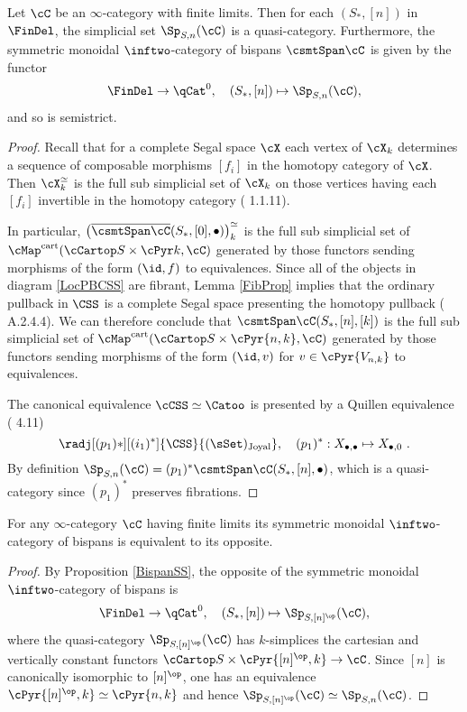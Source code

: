 \documentclass[a4paper]{article}
\numberwithin{equation}{section}
\begin{document}
\begin{prop}
\label{BispanSS}
Let $\cC$ be an $\infty$-category with finite limits. Then for each $(S_*,[n])$ in $\FinDel$, the simplicial set $\Sp_{S,n}(\cC)$ is a quasi-category. Furthermore, the symmetric monoidal $\inftwo$-category of bispans $\csmtSpan \cC$ is given by the functor
  \begin{equation*}
   \FinDel \to \qCat^0, \quad (S_*, [n]) \mapsto \Sp_{S,n} (\cC),
   \end{equation*}
and so is semistrict.
\end{prop}
\begin{proof}
Recall that for a complete Segal space $\cX$ each vertex of $\cX_k$ determines a sequence of composable morphisms $[f_i]$ in the homotopy category of $\cX$. Then $\cX^\simeq_k$ is the full sub simplicial set of $\cX_k$ on those vertices having each $[f_i]$ invertible in the homotopy category (\cite{Lurieinftwo} 1.1.11). 

In particular, $\left(\overline{\csmtSpan \cC}(S_*,[0],\bullet)\right)^\simeq_k$ is the full sub simplicial set of $\cMap^{\rm cart}(\cCartop S \times \cPyr k,\cC)$ generated by those functors sending morphisms of the form $(\id, f)$ to equivalences. Since all of the objects in diagram \ref{LocPBCSS} are fibrant, Lemma \ref{FibProp} implies that the ordinary pullback in $\CSS$ is a complete Segal space presenting the homotopy pullback (\cite{HTT} A.2.4.4). We can therefore conclude that $\csmtSpan \cC(S_*,[n],[k])$ is the full sub simplicial set of $\cMap^{\rm cart}(\cCartop S \times \cPyr {n,k},\cC)$ generated by those functors sending morphisms of the form $(\id, v)$ for $v \in \cPyr{V_{n,k}}$ to equivalences.

The canonical equivalence $\cCSS \simeq \Catoo$ is presented by a Quillen equivalence (\cite{JoyalTierney} 4.11)
\begin{equation*}
 \radj[(p_1)*][(i_1)^*]{\CSS}{(\sSet)_{\rm Joyal}}, \quad (p_1)^*: X_{\bullet,\bullet} \mapsto X_{\bullet,0} \ .
\end{equation*}
By definition $\Sp_{S,n}(\cC) = (p_1)^* \csmtSpan \cC(S_*,[n],\bullet)$, which is a quasi-category since $(p_1)^*$ preserves fibrations.
\end{proof}


\begin{cor}
 \label{bispansop}
 For any $\infty$-category $\cC$ having finite limits its symmetric monoidal $\inftwo$-category of bispans is equivalent to its opposite.
\end{cor}
\begin{proof}
 By Proposition \ref{BispanSS}, the opposite of the symmetric monoidal $\inftwo$-category of bispans is
 \begin{equation*}
  \FinDel \to \qCat^0, \quad (S_*, [n]) \mapsto \Sp_{S,[n]^\op} (\cC), 
 \end{equation*}
where the quasi-category $\Sp_{S,[n]^\op}(\cC)$ has $k$-simplices the cartesian and vertically constant functors $\cCartop S \times \cPyr{[n]^\op,k} \to \cC$. Since $[n]$ is canonically isomorphic to $[n]^\op$, one has an equivalence $\cPyr{[n]^\op,k} \simeq \cPyr{n,k}$ and hence $\Sp_{S,[n]^\op}(\cC) \simeq \Sp_{S,n}(\cC)$.
\end{proof}
\end{document}
